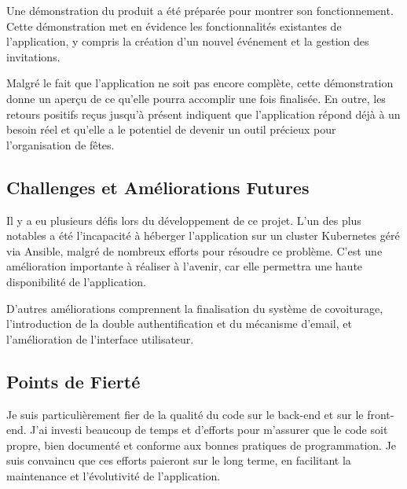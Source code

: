 Une démonstration du produit a été préparée pour montrer son fonctionnement.
Cette démonstration met en évidence les fonctionnalités existantes de l'application, y compris la création d'un nouvel événement et la gestion des invitations.

Malgré le fait que l'application ne soit pas encore complète, cette démonstration donne un aperçu de ce qu'elle pourra accomplir une fois finalisée.
En outre, les retours positifs reçus jusqu'à présent indiquent que l'application répond déjà à
un besoin réel et qu'elle a le potentiel de devenir un outil précieux pour l'organisation de fêtes.

\subsection{Challenges et Améliorations Futures}\label{subsec:challenges-et-ameliorations-futures}

Il y a eu plusieurs défis lors du développement de ce projet.
L'un des plus notables a été l'incapacité à héberger l'application sur un cluster Kubernetes géré via Ansible,
malgré de nombreux efforts pour résoudre ce problème.
C'est une amélioration importante à réaliser à l'avenir, car elle permettra une haute disponibilité de l'application.

D'autres améliorations comprennent la finalisation du système de covoiturage, l'introduction de la double authentification et du mécanisme d'email,
et l'amélioration de l'interface utilisateur.

\subsection{Points de Fierté}\label{subsec:points-de-fierte}

Je suis particulièrement fier de la qualité du code sur le back-end et sur le front-end.
J'ai investi beaucoup de temps et d'efforts pour m'assurer que le code soit propre, bien documenté et conforme aux bonnes pratiques de programmation.
Je suis convaincu que ces efforts paieront sur le long terme, en facilitant la maintenance et l'évolutivité de l'application.